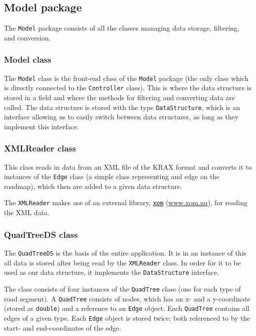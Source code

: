 \documentclass[a4paper,11pt]{article}
\begin{document}
\subsection{Model package} %
The \texttt{Model} package consists of all the classes managing data storage, filtering, and conversion.

\subsubsection{Model class} %
The \texttt{Model} class is the front-end class of the \texttt{Model} package (the only class which is directly connected to the \texttt{Controller} class). This is where the data structure is stored in a field and where the methods for filtering and converting data are called. The data structure is stored with the type \texttt{DataStructure}, which is an interface allowing us to easily switch between data structures, as long as they implement this interface.

\subsubsection{XMLReader class} %
This class reads in data from an XML file of the KRAX format and converts it to instances of the \texttt{Edge} class (a simple class representing and edge on the roadmap), which then are added to a given data structure.

The \texttt{XMLReader} makes use of an external library, \href{www.xom.nu}{\texttt{xom}} (\url{www.xom.nu}), for reading the XML data.

\subsubsection{QuadTreeDS class} %
The \texttt{QuadTreeDS} is the basis of the entire application. It is in an instance of this all data is stored after being read by the \texttt{XMLReader} class. In order for it to be used as our data structure, it implements the \texttt{DataStructure} interface.

The class consists of four instances of the \texttt{QuadTree} class (one for each type of road segment). A \texttt{QuadTree} consists of nodes, which has an x- and a y-coordinate (stored as \texttt{double}) and a reference to an \texttt{Edge} object. Each \texttt{QuadTree} contains all edges of a given type. Each \texttt{Edge} object is stored twice; both referenced to by the start- and end-coordinates of the edge.
\end{document}
